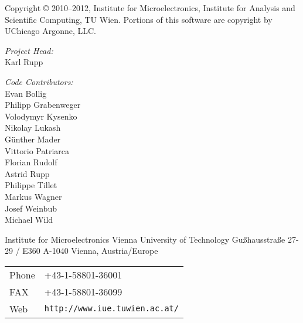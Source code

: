 
\clearpage

Copyright {\copyright} 2010--2012, Institute for Microelectronics,
                            Institute for Analysis and Scientific Computing,
                            TU Wien.
Portions of this software are copyright by UChicago Argonne, LLC.

\vspace{2.cm}

\textit{Project Head:}\\ 

Karl Rupp\\

\vspace{2.cm}

\textit{Code Contributors:} \\

Evan Bollig \\
Philipp Grabenweger \\
Volodymyr Kysenko \\
Nikolay Lukash \\
G\"unther Mader \\
Vittorio Patriarca \\
Florian Rudolf \\
Astrid Rupp \\
Philippe Tillet \\
Markus Wagner \\
Josef Weinbub \\
Michael Wild \\



\vspace{4.0cm}

Institute for Microelectronics\newline
Vienna University of Technology\newline
Gu\ss hausstra\ss e 27-29 / E360\newline
A-1040 Vienna, Austria/Europe\newline


\begin{tabular}{ll}
Phone  & +43-1-58801-36001\\
FAX    & +43-1-58801-36099\\
Web    & \texttt{http://www.iue.tuwien.ac.at/}
\end{tabular}



